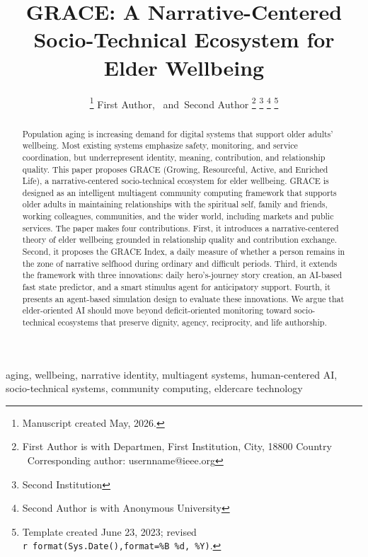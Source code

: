 \documentclass[
  journal,
]{IEEEtran}%
\title{GRACE: A Narrative-Centered Socio-Technical Ecosystem for Elder
Wellbeing}
\author{
\thanks{Manuscript created May, 2026.}
First Author\orcidlink{0000-0001-9430-6091},~\IEEEmembership{Senior
Member, IEEE}
and~Second Author%
\thanks{First Author is with Departmen, First
Institution, City, 18800 Country%
  Corresponding author: usernname@ieee.org
}
\thanks{Second Institution}
\thanks{Second Author is with Anonymous University%
}
\thanks{Template created June 23, 2023; revised
\texttt{r\ format(Sys.Date(),format=\textquotesingle{}\%B\ \%d,\ \%Y\textquotesingle{})}.}
}
\begin{document}


\maketitle

\begin{abstract}
Population aging is increasing demand for digital systems that support
older adults' wellbeing. Most existing systems emphasize safety,
monitoring, and service coordination, but underrepresent identity,
meaning, contribution, and relationship quality. This paper proposes
GRACE (Growing, Resourceful, Active, and Enriched Life), a
narrative-centered socio-technical ecosystem for elder wellbeing. GRACE
is designed as an intelligent multiagent community computing framework
that supports older adults in maintaining relationships with the
spiritual self, family and friends, working colleagues, communities, and
the wider world, including markets and public services. The paper makes
four contributions. First, it introduces a narrative-centered theory of
elder wellbeing grounded in relationship quality and contribution
exchange. Second, it proposes the GRACE Index, a daily measure of
whether a person remains in the zone of narrative selfhood during
ordinary and difficult periods. Third, it extends the framework with
three innovations: daily hero's-journey story creation, an AI-based fast
state predictor, and a smart stimulus agent for anticipatory support.
Fourth, it presents an agent-based simulation design to evaluate these
innovations. We argue that elder-oriented AI should move beyond
deficit-oriented monitoring toward socio-technical ecosystems that
preserve dignity, agency, reciprocity, and life authorship.
\end{abstract}
\begin{IEEEkeywords}
aging, wellbeing, narrative identity, multiagent systems, human-centered
AI, socio-technical systems, community computing, eldercare technology
\end{IEEEkeywords}

%
\end{document}

